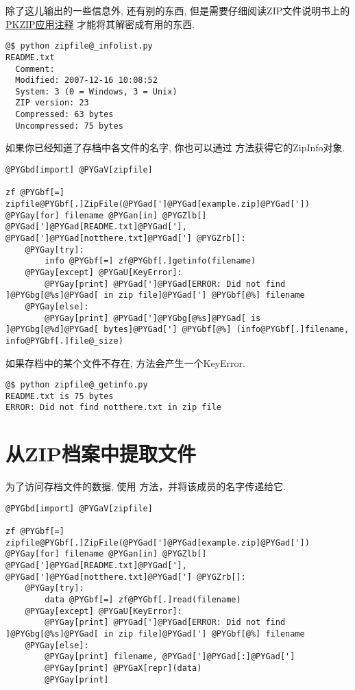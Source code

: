 \documentclass[a4paper,10pt,english]{manual}
\begin{document}
除了这儿输出的一些信息外, 还有别的东西, 但是需要仔细阅读ZIP文件说明书上的 \href{http://www.pkware.com/business\_and\_developers/developer/appnote/}{PKZIP应用注释} 才能将其解密成有用的东西.

\begin{Verbatim}[commandchars=@\[\]]
@$ python zipfile@_infolist.py
README.txt
  Comment:
  Modified: 2007-12-16 10:08:52
  System: 3 (0 = Windows, 3 = Unix)
  ZIP version: 23
  Compressed: 63 bytes
  Uncompressed: 75 bytes
\end{Verbatim}

如果你已经知道了存档中各文件的名字, 你也可以通过  方法获得它的ZipInfo对象.

\begin{Verbatim}[commandchars=@\[\]]
@PYGbd[import] @PYGaV[zipfile]

zf @PYGbf[=] zipfile@PYGbf[.]ZipFile(@PYGad[']@PYGad[example.zip]@PYGad['])
@PYGay[for] filename @PYGan[in] @PYGZlb[] @PYGad[']@PYGad[README.txt]@PYGad['], @PYGad[']@PYGad[notthere.txt]@PYGad['] @PYGZrb[]:
    @PYGay[try]:
        info @PYGbf[=] zf@PYGbf[.]getinfo(filename)
    @PYGay[except] @PYGaU[KeyError]:
        @PYGay[print] @PYGad[']@PYGad[ERROR: Did not find ]@PYGbg[@%s]@PYGad[ in zip file]@PYGad['] @PYGbf[@%] filename
    @PYGay[else]:
        @PYGay[print] @PYGad[']@PYGbg[@%s]@PYGad[ is ]@PYGbg[@%d]@PYGad[ bytes]@PYGad['] @PYGbf[@%] (info@PYGbf[.]filename, info@PYGbf[.]file@_size)
\end{Verbatim}

如果存档中的某个文件不存在,  方法会产生一个KeyError.

\begin{Verbatim}[commandchars=@\[\]]
@$ python zipfile@_getinfo.py
README.txt is 75 bytes
ERROR: Did not find notthere.txt in zip file
\end{Verbatim}


\section{从ZIP档案中提取文件}

为了访问存档文件的数据, 使用  方法，并将该成员的名字传递给它.

\begin{Verbatim}[commandchars=@\[\]]
@PYGbd[import] @PYGaV[zipfile]

zf @PYGbf[=] zipfile@PYGbf[.]ZipFile(@PYGad[']@PYGad[example.zip]@PYGad['])
@PYGay[for] filename @PYGan[in] @PYGZlb[] @PYGad[']@PYGad[README.txt]@PYGad['], @PYGad[']@PYGad[notthere.txt]@PYGad['] @PYGZrb[]:
    @PYGay[try]:
        data @PYGbf[=] zf@PYGbf[.]read(filename)
    @PYGay[except] @PYGaU[KeyError]:
        @PYGay[print] @PYGad[']@PYGad[ERROR: Did not find ]@PYGbg[@%s]@PYGad[ in zip file]@PYGad['] @PYGbf[@%] filename
    @PYGay[else]:
        @PYGay[print] filename, @PYGad[']@PYGad[:]@PYGad[']
        @PYGay[print] @PYGaX[repr](data)
        @PYGay[print]
\end{Verbatim}
\end{document}
